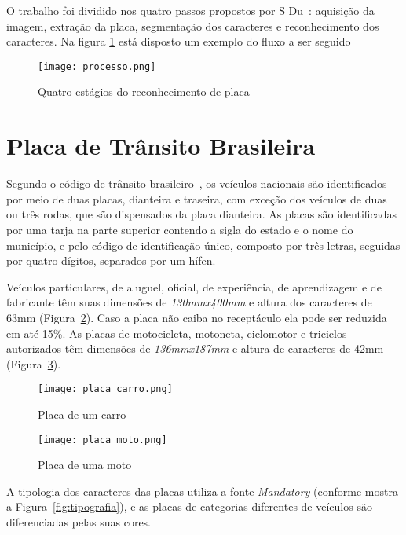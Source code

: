 O trabalho foi dividido nos quatro passos propostos por S
Du~\cite{s2013automatic}: aquisição da imagem, extração da placa, segmentação dos caracteres e reconhecimento dos caracteres. Na figura \ref{fig:processo} está disposto um exemplo do fluxo a ser seguido

\begin{figure}[H]
	\centering
	\texttt{[image: processo.png]}
	\caption{Quatro estágios do reconhecimento de placa}
	\label{fig:processo}
\end{figure}

\section{Placa de Trânsito Brasileira}
\label{sec:placabr}

Segundo o código de trânsito brasileiro~\cite{brasil1997lei}, os veículos nacionais são identificados por meio de duas placas, dianteira e traseira, com exceção dos veículos de duas ou três rodas, que são dispensados da placa dianteira. As placas são identificadas por uma tarja na parte superior contendo a sigla do estado e o
nome do município, e pelo código de identificação único, composto por três
letras, seguidas por quatro dígitos, separados por um hífen.

Veículos particulares, de aluguel, oficial, de experiência, de aprendizagem e de
fabricante têm suas dimensões de \emph{130mmx400mm} e altura dos caracteres de 63mm (Figura~\ref{fig:placa_carro}).
Caso a placa não caiba no receptáculo ela pode ser reduzida em até 15\%. As
placas de motocicleta, motoneta, ciclomotor e triciclos autorizados têm
dimensões de \emph{136mmx187mm} e altura de caracteres de 42mm (Figura~\ref{fig:placa_moto}).

\begin{figure}[H]
	\centering
	\texttt{[image: placa\_carro.png]}
	\caption{Placa de um carro}
	\label{fig:placa_carro}
\end{figure}

\begin{figure}[H]
	\centering
	\texttt{[image: placa\_moto.png]}
	\caption{Placa de uma moto}
	\label{fig:placa_moto}
\end{figure}

A tipologia dos caracteres das placas utiliza a fonte \emph{Mandatory} (conforme mostra a Figura~\ref{fig:tipografia}), e as placas de categorias diferentes de veículos são diferenciadas pelas suas cores.

